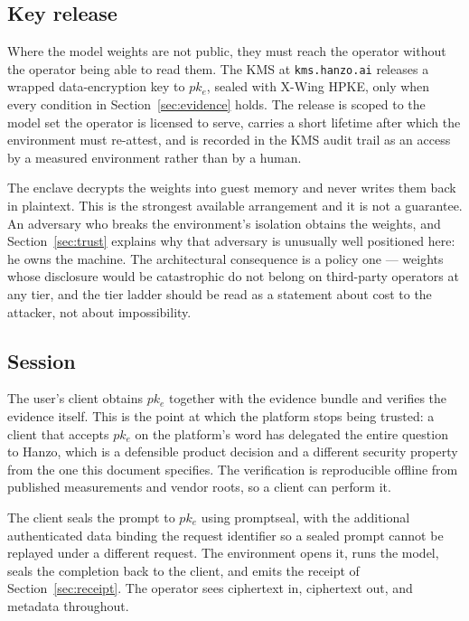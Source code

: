 \documentclass[11pt]{article}
\newcommand{\code}[1]{\texttt{#1}}
\begin{document}
\subsection{Key release}

Where the model weights are not public, they must reach the operator without the operator being able
to read them. The KMS at \code{kms.hanzo.ai} releases a wrapped data-encryption key to $pk_e$, sealed
with X-Wing HPKE, only when every condition in Section~\ref{sec:evidence} holds. The release is
scoped to the model set the operator is licensed to serve, carries a short lifetime after which the
environment must re-attest, and is recorded in the KMS audit trail as an access by a measured
environment rather than by a human.

The enclave decrypts the weights into guest memory and never writes them back in plaintext. This is
the strongest available arrangement and it is not a guarantee. An adversary who breaks the
environment's isolation obtains the weights, and Section~\ref{sec:trust} explains why that adversary
is unusually well positioned here: he owns the machine. The architectural consequence is a policy
one --- weights whose disclosure would be catastrophic do not belong on third-party operators at any
tier, and the tier ladder should be read as a statement about cost to the attacker, not about
impossibility.

\subsection{Session}

The user's client obtains $pk_e$ together with the evidence bundle and verifies the evidence itself.
This is the point at which the platform stops being trusted: a client that accepts $pk_e$ on the
platform's word has delegated the entire question to Hanzo, which is a defensible product decision
and a different security property from the one this document specifies. The verification is
reproducible offline from published measurements and vendor roots, so a client can perform it.

The client seals the prompt to $pk_e$ using promptseal, with the additional authenticated data
binding the request identifier so a sealed prompt cannot be replayed under a different request. The
environment opens it, runs the model, seals the completion back to the client, and emits the receipt
of Section~\ref{sec:receipt}. The operator sees ciphertext in, ciphertext out, and metadata
throughout.
\end{document}
